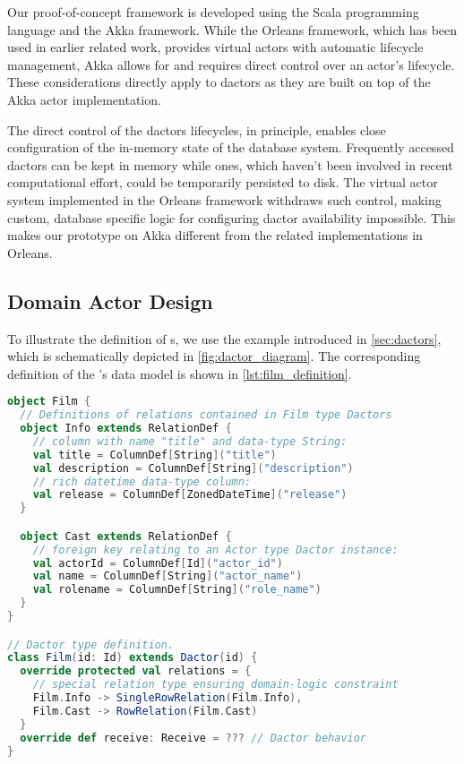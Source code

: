 Our proof-of-concept framework is developed using the Scala programming language and the Akka framework.
While the Orleans framework, which has been used in earlier related work, provides virtual actors with automatic lifecycle management, Akka allows for and requires direct control over an actor's lifecycle.
These considerations directly apply to \glspl{dactor} as they are built on top of the Akka actor implementation.

The direct control of the \glspl{dactor} lifecycles, in principle, enables close configuration of the in-memory state of the database system.
Frequently accessed \glspl{dactor} can be kept in memory while ones, which haven't been involved in recent computational effort, could be temporarily persisted to disk.
The virtual actor system implemented in the Orleans framework withdraws such control, making custom, database specific logic for configuring \gls{dactor} availability impossible.
This makes our prototype on Akka different from the related implementations in Orleans.

\subsection{Domain Actor Design}\label{subsec:domain_actor_design}

To illustrate the definition of s, we use the example introduced in \cref{sec:dactors}, which is schematically depicted in \cref{fig:dactor_diagram}.
The corresponding definition of the 's data model is shown in \cref{lst:film_definition}.
\begin{lstlisting}[float, caption={Film Dactor type definition using the presented framework.}, label={lst:film_definition}, language=Scala]
object Film {
  // Definitions of relations contained in Film type Dactors
  object Info extends RelationDef {
    // column with name "title" and data-type String:
    val title = ColumnDef[String]("title")
    val description = ColumnDef[String]("description")
    // rich datetime data-type column:
    val release = ColumnDef[ZonedDateTime]("release")
  }

  object Cast extends RelationDef {
    // foreign key relating to an Actor type Dactor instance:
    val actorId = ColumnDef[Id]("actor_id")
    val name = ColumnDef[String]("actor_name")
    val rolename = ColumnDef[String]("role_name")
  }
} 

// Dactor type definition.
class Film(id: Id) extends Dactor(id) {
  override protected val relations = {
    // special relation type ensuring domain-logic constraint
    Film.Info -> SingleRowRelation(Film.Info),
    Film.Cast -> RowRelation(Film.Cast)
  }
  override def receive: Receive = ??? // Dactor behavior
}
\end{lstlisting}

